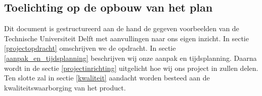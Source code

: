 \subsection{Toelichting op de opbouw van het plan}


Dit document is gestructureerd aan de hand de gegeven voorbeelden van de Technische Universiteit Delft met aanvullingen naar ons eigen inzicht.
In sectie \ref{projectopdracht} omschrijven we de opdracht.
In sectie \ref{aanpak_en_tijdsplanning} beschrijven wij onze aanpak en tijdsplanning.
Daarna wordt in de sectie \ref{projectinrichting} uitgelicht hoe wij ons project in zullen delen.
Ten slotte zal in sectie \ref{kwaliteit} aandacht worden besteed aan de kwaliteitswaarborging van het product.
\pagebreak